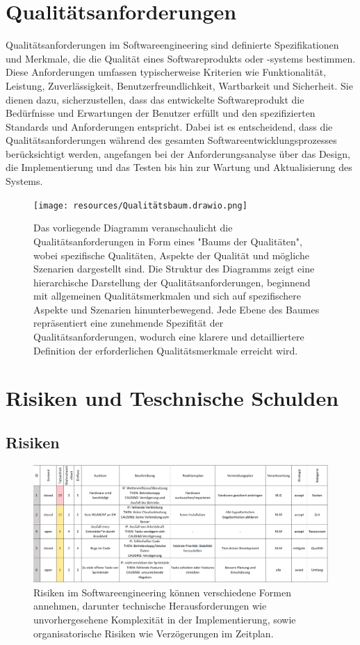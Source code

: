 \documentclass[
]{article}
\begin{document}
\section{Qualitätsanforderungen}
Qualitätsanforderungen im Softwareengineering sind definierte Spezifikationen und Merkmale, die die Qualität eines Softwareprodukts oder -systems bestimmen.
Diese Anforderungen umfassen typischerweise Kriterien wie Funktionalität, Leistung, Zuverlässigkeit, Benutzerfreundlichkeit, Wartbarkeit und Sicherheit.
Sie dienen dazu, sicherzustellen, dass das entwickelte Softwareprodukt die Bedürfnisse und Erwartungen der Benutzer erfüllt und den spezifizierten Standards und Anforderungen entspricht.
Dabei ist es entscheidend, dass die Qualitätsanforderungen während des gesamten Softwareentwicklungsprozesses berücksichtigt werden, angefangen bei der Anforderungsanalyse über das Design, die Implementierung und das Testen bis hin zur Wartung und Aktualisierung des Systems.
\begin{figure}[H]
	\centering
	\texttt{[image: resources/Qualitätsbaum.drawio.png]}
	\caption{Das vorliegende Diagramm veranschaulicht die Qualitätsanforderungen in Form eines "Baums der Qualitäten", wobei spezifische Qualitäten, Aspekte der Qualität und mögliche Szenarien dargestellt sind. Die Struktur des Diagramms zeigt eine hierarchische Darstellung der Qualitätsanforderungen, beginnend mit allgemeinen Qualitätsmerkmalen und sich auf spezifischere Aspekte und Szenarien hinunterbewegend. Jede Ebene des Baumes repräsentiert eine zunehmende Spezifität der Qualitätsanforderungen, wodurch eine klarere und detailliertere Definition der erforderlichen Qualitätsmerkmale erreicht wird.}
	\label{fig:Verteilungssicht}
\end{figure}  

\section{Risiken und Teschnische Schulden}
\subsection{Risiken}
\begin{figure}[H]
	\centering
	\includegraphics[width=160mm]{resources/Risiken.png}
	\caption{Risiken im Softwareengineering können verschiedene Formen annehmen, darunter technische Herausforderungen wie unvorhergesehene Komplexität in der Implementierung, sowie organisatorische Risiken wie Verzögerungen im Zeitplan.}
	\label{fig:Risiken}
\end{figure}
\end{document}
